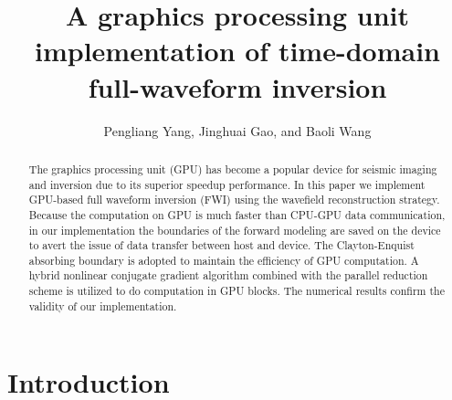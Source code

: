 
\renewcommand{\thefootnote}{\fnsymbol{footnote}}

\title{A graphics processing unit implementation of time-domain full-waveform inversion}

\author{Pengliang Yang\footnotemark[1], Jinghuai Gao\footnotemark[1], and Baoli Wang\footnotemark[2]
}




\address{
\footnotemark[1]Xi'an Jiaotong University,\\ 
National Engineering Laboratory for Offshore Oil Exploration,\\
 Xi'an, China, 710049\\
ypl.2100@gmail.com, jhgao@mail.xjtu.edu.cn\\
\footnotemark[2]CCTEG  Xi'an Research Institute,\\
Xi'an, China, 710077\\
pooly1981@163.com
}

\maketitle

\begin{abstract}
The graphics processing unit (GPU) has become a popular device for seismic imaging and inversion due to its superior speedup performance. In this paper we implement GPU-based full waveform inversion (FWI) using the wavefield reconstruction strategy. Because the computation on GPU is much faster than CPU-GPU data communication, in our implementation the boundaries of the forward modeling are saved on the device to avert the issue of data transfer between host and device. The Clayton-Enquist absorbing boundary is adopted to maintain the efficiency of GPU computation. A hybrid nonlinear conjugate gradient algorithm combined with the parallel reduction scheme is utilized to do computation in GPU blocks. The numerical results confirm the validity of our implementation. 

\end{abstract}


\section{Introduction}

